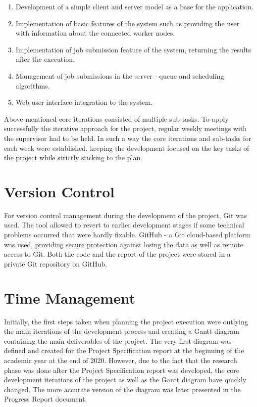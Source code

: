 \documentclass[10pt]{report}
\begin{document}
\begin{enumerate}
    \item Development of a simple client and server model as a base for the application.
    \item Implementation of basic features of the system such as providing the user with information about the connected worker nodes.
    \item Implementation of job submission feature of the system, returning the results after the execution.
    \item Management of job submissions in the server - queue and scheduling algorithms.
    \item Web user interface integration to the system.
\end{enumerate}

Above mentioned core iterations consisted of multiple sub-tasks. To apply successfully the iterative approach for the project, regular weekly meetings with the supervisor had to be held. In such a way the core iterations and sub-tasks for each week were established, keeping the development focused on the key tasks of the project while strictly sticking to the plan.

\section{Version Control}

For version control management during the development of the project, Git was used. The tool allowed to revert to earlier development stages if some technical problems occurred that were hardly fixable. GitHub - a Git cloud-based platform was used, providing secure protection against losing the data as well as remote access to Git. Both the code and the report of the project were stored in a private Git repository on GitHub.

\section{Time Management}

Initially, the first steps taken when planning the project execution were outlying the main iterations of the development process and creating a Gantt diagram containing the main deliverables of the project. The very first diagram was defined and created for the Project Specification report at the beginning of the academic year at the end of 2020. However, due to the fact that the research phase was done after the Project Specification report was developed, the core development iterations of the project as well as the Gantt diagram have quickly changed. The more accurate version of the diagram was later presented in the Progress Report document.
\newline
\end{document}
